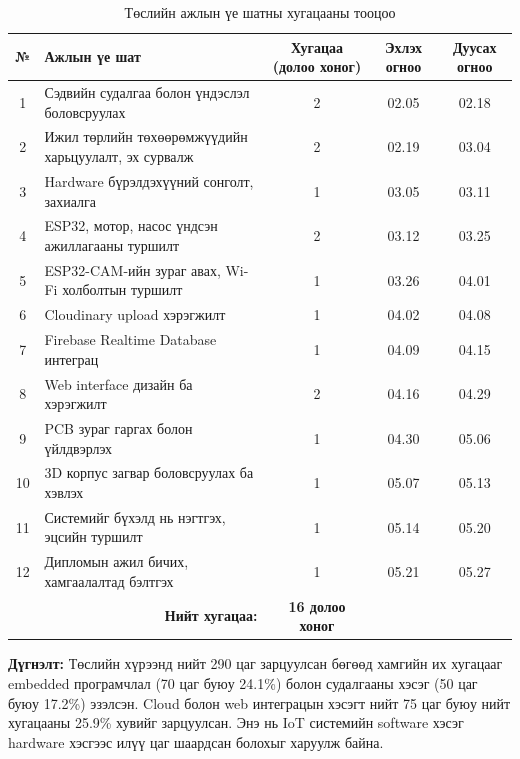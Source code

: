 \documentclass[12pt,a4paper]{report}
\begin{document}
\begin{table}[H]
\centering
\scriptsize
\caption{Төслийн ажлын үе шатны хугацааны тооцоо}
\label{tab:project-timeline}
\begin{tabularx}{\textwidth}{|c|X|c|c|c|}
\hline
\textbf{№} & \textbf{Ажлын үе шат} & \textbf{Хугацаа (долоо хоног)} & \textbf{Эхлэх огноо} & \textbf{Дуусах огноо} \\ \hline
1  & Сэдвийн судалгаа болон үндэслэл боловсруулах             & 2 & 02.05 & 02.18 \\ \hline
2  & Ижил төрлийн төхөөрөмжүүдийн харьцуулалт, эх сурвалж     & 2 & 02.19 & 03.04 \\ \hline
3  & Hardware бүрэлдэхүүний сонголт, захиалга                 & 1 & 03.05 & 03.11 \\ \hline
4  & ESP32, мотор, насос үндсэн ажиллагааны туршилт            & 2 & 03.12 & 03.25 \\ \hline
5  & ESP32-CAM-ийн зураг авах, Wi-Fi холболтын туршилт         & 1 & 03.26 & 04.01 \\ \hline
6  & Cloudinary upload хэрэгжилт                              & 1 & 04.02 & 04.08 \\ \hline
7  & Firebase Realtime Database интеграц                      & 1 & 04.09 & 04.15 \\ \hline
8  & Web interface дизайн ба хэрэгжилт                        & 2 & 04.16 & 04.29 \\ \hline
9  & PCB зураг гаргах болон үйлдвэрлэх                        & 1 & 04.30 & 05.06 \\ \hline
10 & 3D корпус загвар боловсруулах ба хэвлэх                  & 1 & 05.07 & 05.13 \\ \hline
11 & Системийг бүхэлд нь нэгтгэх, эцсийн туршилт              & 1 & 05.14 & 05.20 \\ \hline
12 & Дипломын ажил бичих, хамгаалалтад бэлтгэх                 & 1 & 05.21 & 05.27 \\ \hline
\multicolumn{2}{|r|}{\textbf{Нийт хугацаа:}} & \textbf{16 долоо хоног} & & \\ \hline
\end{tabularx}
\end{table}



\textbf{Дүгнэлт:} Төслийн хүрээнд нийт 290 цаг зарцуулсан бөгөөд хамгийн их хугацааг embedded програмчлал (70 цаг буюу 24.1\%) болон судалгааны хэсэг (50 цаг буюу 17.2\%) эзэлсэн. Cloud болон web интеграцын хэсэгт нийт 75 цаг буюу нийт хугацааны 25.9\% хувийг зарцуулсан. Энэ нь IoT системийн software хэсэг hardware хэсгээс илүү цаг шаардсан болохыг харуулж байна.
\end{document}
